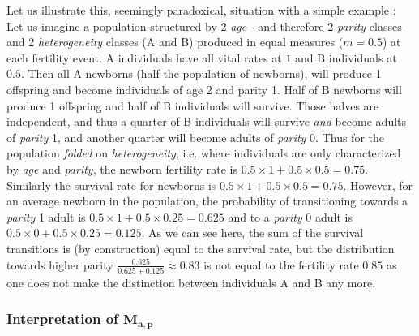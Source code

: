 \documentclass[10pt,a4paper]{article}
\begin{document}
Let us illustrate this, seemingly paradoxical, situation with a simple example : Let us imagine a population structured by 2 \emph{age} - and therefore 2 \emph{parity} classes - and 2 \emph{heterogeneity} classes (A and B) produced in equal measures ($m=0.5$) at each fertility event. A individuals have all vital rates at $1$ and B individuals at $0.5$.
Then all A newborns (half the population of newborns), will produce 1 offspring and become individuals of age 2 and parity 1. Half of B newborns will produce 1 offspring and half of B individuals will survive. Those halves are independent, and thus a quarter of B individuals will survive \emph{and} become adults of \emph{parity} 1, and another quarter will become adults of \emph{parity} 0.
Thus for the population \emph{folded} on \emph{heterogeneity}, i.e. where individuals are only characterized by \emph{age} and \emph{parity}, the newborn fertility rate is $0.5\times 1+0.5\times 0.5 = 0.75 $. Similarly the survival rate for newborns is $0.5\times 1+0.5\times 0.5 = 0.75 $. However, for an average newborn in the population, the probability of transitioning towards a \emph{parity} 1 adult is $0.5\times 1+0.5\times 0.25 = 0.625 $ and to a \emph{parity} 0 adult is $0.5\times 0+0.5\times 0.25 = 0.125 $. As we can see here, the sum of the survival transitions is (by construction) equal to the survival rate, but the distribution towards higher parity $\frac{0.625}{0.625+0.125}\approx 0.83$ is not equal to the fertility rate $0.85$ as one does not make the distinction between individuals A and B any more.

\subsubsection*{Interpretation of \texorpdfstring{$\mathbf{M_{a,p}}$}{Map}}
\end{document}
